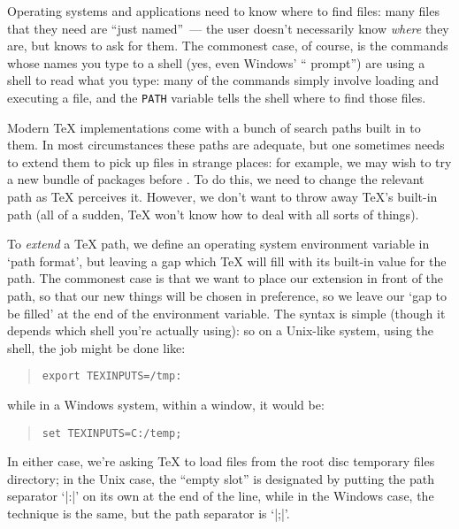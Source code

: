 
Operating systems and applications need to know where to find files:
many files that they need are ``just named''~--- the user doesn't
necessarily know \emph{where} they are, but knows to ask for them.
The commonest case, of course, is the commands whose names you type to
a shell (yes, even Windows' ``\MSDOS{} prompt'') are using a shell to read what
you type: many of the commands simply involve loading and executing a
file, and the \texttt{PATH} variable tells the shell where to find those files.

Modern \TeX{} implementations come with a bunch of search paths
built in to them.  In most circumstances these paths are adequate, but
one sometimes needs to extend them to pick up files in strange
places: for example, we may wish to try a new bundle of packages
before .  To do
this, we need to change the relevant path as \TeX{} perceives it.
However, we don't want to throw away \TeX{}'s built-in path (all of a
sudden, \TeX{} won't know how to deal with all sorts of things).

To \emph{extend} a \TeX{} path, we define an operating system
environment variable in `path format', but leaving a gap which \TeX{}
will fill with its built-in value for the path.  The commonest case is
that we want to place our extension in front of the path, so that our
new things will be chosen in preference, so we leave our `gap to be
filled' at the end of the environment variable.  The syntax is simple
(though it depends which shell you're actually using): so on a
Unix-like system, using the  shell, the job might be
done like:
\begin{quote}
\begin{verbatim}
export TEXINPUTS=/tmp:
\end{verbatim}
\end{quote}
while in a Windows system, within a \MSDOS{} window, it would be:
\begin{quote}
\begin{verbatim}
set TEXINPUTS=C:/temp;
\end{verbatim}
\end{quote}
In either case, we're asking \TeX{} to load files from the root disc
temporary files directory; in the Unix case, the ``empty slot'' is
designated by putting the path separator `|:|' on its own at the end
of the line, while in the Windows case, the technique is the same, but
the path separator is `|;|'.

